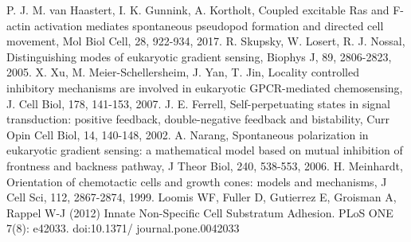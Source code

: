 \documentclass[10pt,letterpaper]{article}
\begin{document}
\begin{thebibliography}{}
 P. J. M. van Haastert, I. K. Gunnink, A. Kortholt, Coupled excitable Ras and F-actin activation mediates spontaneous pseudopod formation and directed cell movement, Mol Biol Cell, 28, 922-934, 2017.
 R. Skupsky, W. Losert, R. J. Nossal, Distinguishing modes of eukaryotic gradient sensing, Biophys J, 89, 2806-2823, 2005.
 X. Xu, M. Meier-Schellersheim, J. Yan, T. Jin, Locality controlled inhibitory mechanisms are involved in eukaryotic GPCR-mediated chemosensing, J. Cell Biol, 178, 141-153, 2007.
 J. E. Ferrell, Self-perpetuating states in signal transduction: positive feedback, double-negative feedback and bistability, Curr Opin Cell Biol, 14, 140-148, 2002.
 A. Narang, Spontaneous polarization in eukaryotic gradient sensing: a mathematical model based on mutual inhibition of frontness and backness pathway, J Theor Biol, 240, 538-553, 2006.
 H. Meinhardt, Orientation of chemotactic cells and growth cones: models and mechanisms, J Cell Sci, 112, 2867-2874, 1999. 
Loomis WF, Fuller D, Gutierrez E, Groisman A, Rappel W-J (2012) Innate Non-Specific Cell Substratum Adhesion. PLoS ONE 7(8): e42033. doi:10.1371/ journal.pone.0042033

 \end{thebibliography}
%
%
% 
%
\end{document}
